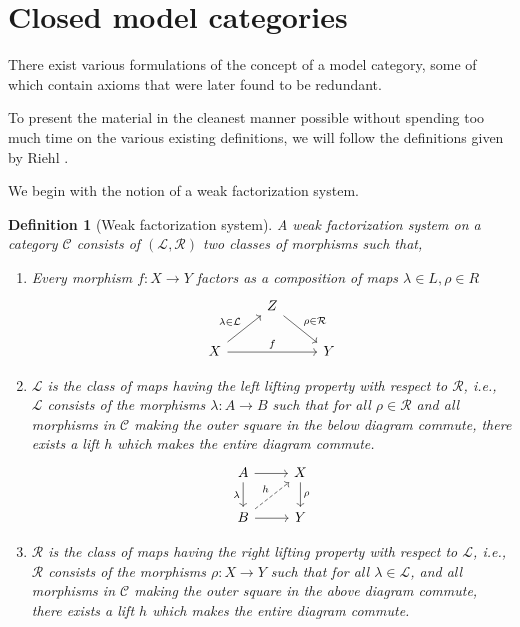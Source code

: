 \documentclass[12pt]{report}
\numberwithin{equation}{section}
\newtheorem{definition}[dummy]{Definition}
\begin{document}
	 
	\section{Closed model categories}
	There exist various formulations of the concept of a model category, some of which contain axioms that were later found to be redundant.
	
	To present the material in the cleanest manner possible without spending too much time on the various existing definitions, we will follow the definitions given by Riehl \cite{riehlmodelcat}.
	
	We begin with the notion of a weak factorization system.
	\begin{definition}[Weak factorization system]
		A weak factorization system on a category $\mathcal{C}$ consists of $(\mathcal{L,R})$ two classes of morphisms such that,
		\begin{enumerate}
			\item Every morphism $f:X \to Y$ factors as a composition of maps $\lambda \in L, \rho \in R $
			\[\begin{tikzcd}
				& Z \\
				X && Y
				\arrow["{\rho \in \mathcal{R}}", from=1-2, to=2-3]
				\arrow["{\lambda \in \mathcal{L}}", from=2-1, to=1-2]
				\arrow["f", from=2-1, to=2-3]
			\end{tikzcd}\]
			\item $\mathcal{L}$ is the class of maps having the left lifting property with respect to $\mathcal{R}$, i.e., $\mathcal{L}$ consists of the morphisms $\lambda :A \to B$ such that for all $\rho \in \mathcal{R}$ and all morphisms in $\mathcal{C}$ making the outer square in the below diagram commute, there exists a lift $h$ which makes the entire diagram commute.
			\[\begin{tikzcd}
				A & X \\
				B & Y
				\arrow[from=1-1, to=1-2]
				\arrow["\lambda"', from=1-1, to=2-1]
				\arrow["\rho", from=1-2, to=2-2]
				\arrow["h", dashed, from=2-1, to=1-2]
				\arrow[from=2-1, to=2-2]
			\end{tikzcd}\]
			
			
			
			\item $\mathcal{R}$ is the class of maps having the right lifting property with respect to $\mathcal{L}$, i.e., $\mathcal{R}$ consists of the morphisms $\rho :X \to Y$ such that for all $\lambda \in \mathcal{L}$, and all morphisms in $\mathcal{C}$ making the outer square in the above diagram commute, there exists a lift $h$ which makes the entire diagram commute.
		\end{enumerate}
	\end{definition}
	
\end{document}
